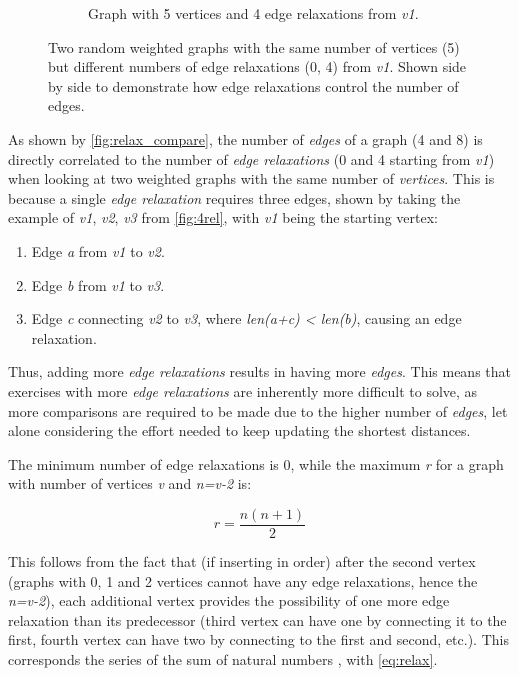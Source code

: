 \documentclass{l4proj}
\begin{document}
\begin{figure}
\begin{subfigure}[b]{0.49\textwidth}
        \caption{Graph with 5 vertices and 4 edge relaxations from \emph{v1}.}
        \label{fig:4rel}
    \end{subfigure}   
    \caption{Two random weighted graphs with the same number of vertices (5) but different numbers of edge relaxations (0, 4) from \emph{v1}. Shown side by side to demonstrate how edge relaxations control the number of edges. }\label{fig:relax_compare}
\end{figure}

As shown by \autoref{fig:relax_compare}, the number of \emph{edges} of a graph (4 and 8) is directly correlated to the number of \emph{edge relaxations} (0 and 4 starting from \emph{v1}) when looking at two weighted graphs with the same number of \emph{vertices}. This is because a single \emph{edge relaxation} requires three edges, shown by taking the example of \emph{v1}, \emph{v2}, \emph{v3} from \autoref{fig:4rel}, with \emph{v1} being the starting vertex:
\begin{enumerate}
	\item
	Edge \emph{a} from \emph{v1} to \emph{v2}.
	\item
	Edge \emph{b} from \emph{v1} to \emph{v3}.
	\item
	Edge \emph{c} connecting \emph{v2} to \emph{v3}, where \emph{len(a+c) < len(b)}, causing an edge relaxation.
\end{enumerate}

Thus, adding more \emph{edge relaxations} results in having more \emph{edges}. This means that exercises with more \emph{edge relaxations} are inherently more difficult to solve, as more comparisons are required to be made due to the higher number of \emph{edges}, let alone considering the effort needed to keep updating the shortest distances. 

The minimum number of edge relaxations is 0, while the maximum \emph{r} for a graph with number of vertices \emph{v} and \emph{n=v-2} is:

\begin{equation}
	\label{eq:relax}
	r = \frac{n (n + 1)}{2}
\end{equation}

This follows from the fact that (if inserting in order) after the second vertex (graphs with 0, 1 and 2 vertices cannot have any edge relaxations, hence the \emph{n=v-2}), each additional vertex provides the possibility of one more edge relaxation than its predecessor (third vertex can have one by connecting it to the first, fourth vertex can have two by connecting to the first and second, etc.). This corresponds the series of the sum of natural numbers \cite{a}, with \autoref{eq:relax}.
\end{document}
